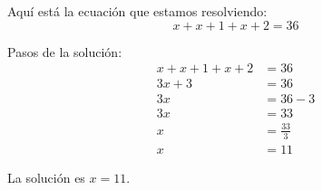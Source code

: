 \documentclass{article} %
\begin{document}

Aquí está la ecuación que estamos resolviendo:
$$x + x + 1 + x + 2 = 36$$

Pasos de la solución:
\begin{align*}
x + x + 1 + x + 2 &= 36 \\
3x + 3 &= 36 \\
3x &= 36 - 3 \\
3x &= 33 \\
x &= \frac{33}{3} \\
x &= 11
\end{align*}

La solución es $x=11$.
\end{document}
